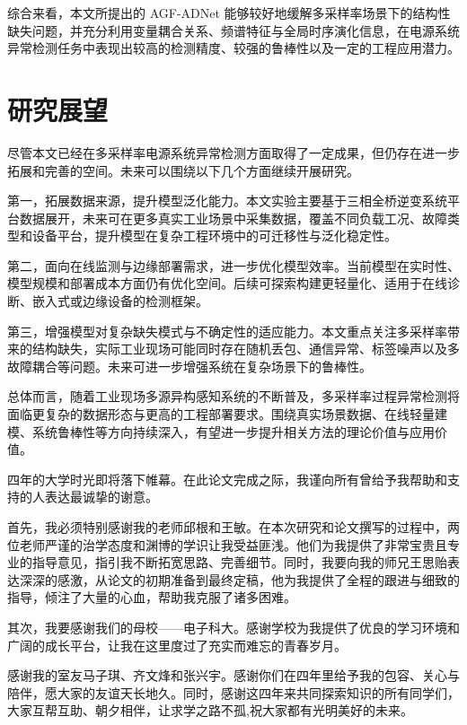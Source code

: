 \documentclass[bachelor, vlined]{DissertUESTC}
\begin{document}
        综合来看，本文所提出的 AGF-ADNet 能够较好地缓解多采样率场景下的结构性缺失问题，并充分利用变量耦合关系、频谱特征与全局时序演化信息，在电源系统异常检测任务中表现出较高的检测精度、较强的鲁棒性以及一定的工程应用潜力。

        \section{研究展望}

        尽管本文已经在多采样率电源系统异常检测方面取得了一定成果，但仍存在进一步拓展和完善的空间。未来可以围绕以下几个方面继续开展研究。

        第一，拓展数据来源，提升模型泛化能力。本文实验主要基于三相全桥逆变系统平台数据展开，未来可在更多真实工业场景中采集数据，覆盖不同负载工况、故障类型和设备平台，提升模型在复杂工程环境中的可迁移性与泛化稳定性。

        第二，面向在线监测与边缘部署需求，进一步优化模型效率。当前模型在实时性、模型规模和部署成本方面仍有优化空间。后续可探索构建更轻量化、适用于在线诊断、嵌入式或边缘设备的检测框架。

        第三，增强模型对复杂缺失模式与不确定性的适应能力。本文重点关注多采样率带来的结构缺失，实际工业现场可能同时存在随机丢包、通信异常、标签噪声以及多故障耦合等问题。未来可进一步增强系统在复杂场景下的鲁棒性。

        总体而言，随着工业现场多源异构感知系统的不断普及，多采样率过程异常检测将面临更复杂的数据形态与更高的工程部署要求。围绕真实场景数据、在线轻量建模、系统鲁棒性等方向持续深入，有望进一步提升相关方法的理论价值与应用价值。

		\acknowledgement

        四年的大学时光即将落下帷幕。在此论文完成之际，我谨向所有曾给予我帮助和支持的人表达最诚挚的谢意。

        首先，我必须特别感谢我的老师邱根和王敏。在本次研究和论文撰写的过程中，两位老师严谨的治学态度和渊博的学识让我受益匪浅。他们为我提供了非常宝贵且专业的指导意见，指引我不断拓宽思路、完善细节。同时，我要向我的师兄王思贻表达深深的感激，从论文的初期准备到最终定稿，他为我提供了全程的跟进与细致的指导，倾注了大量的心血，帮助我克服了诸多困难。

        其次，我要感谢我们的母校——电子科大。感谢学校为我提供了优良的学习环境和广阔的成长平台，让我在这里度过了充实而难忘的青春岁月。

        感谢我的室友马子琪、齐文烽和张兴宇。感谢你们在四年里给予我的包容、关心与陪伴，愿大家的友谊天长地久。同时，感谢这四年来共同探索知识的所有同学们，大家互帮互助、朝夕相伴，让求学之路不孤,祝大家都有光明美好的未来。
\end{document}
